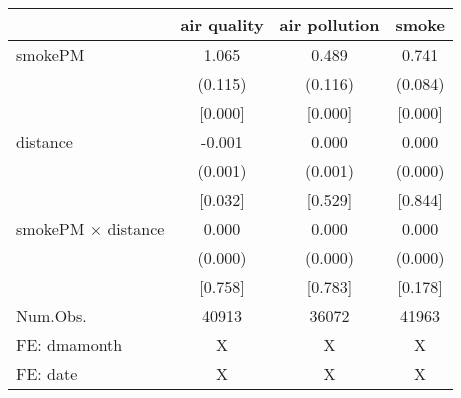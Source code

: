 \begin{table}
\centering
\begin{tabular}[t]{lccc}
\toprule
  & air quality & air pollution & smoke\\
\midrule
smokePM & 1.065 & 0.489 & 0.741\\
 & (0.115) & (0.116) & (0.084)\\
 & {}[0.000] & {}[0.000] & {}[0.000]\\
distance & -0.001 & 0.000 & 0.000\\
 & (0.001) & (0.001) & (0.000)\\
 & {}[0.032] & {}[0.529] & {}[0.844]\\
smokePM × distance & 0.000 & 0.000 & 0.000\\
 & (0.000) & (0.000) & (0.000)\\
 & {}[0.758] & {}[0.783] & {}[0.178]\\
\midrule
Num.Obs. & 40913 & 36072 & 41963\\
FE: dmamonth & X & X & X\\
FE: date & X & X & X\\
\bottomrule
\end{tabular}
\end{table}
